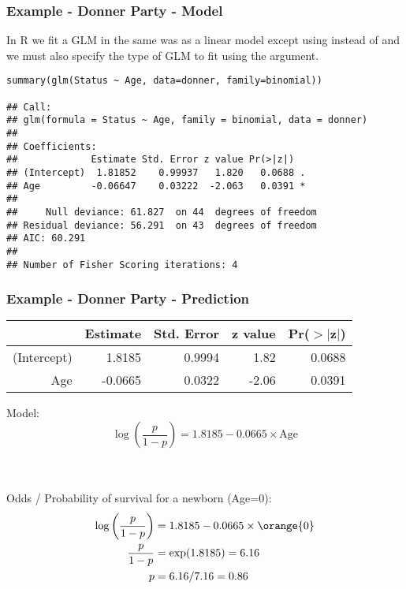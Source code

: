\begin{frame}[fragile]
\frametitle{Example - Donner Party - Model}
\vspace{-2mm}
In R we fit a GLM in the same was as a linear model except using  instead of  and we must also specify the type of GLM to fit using the  argument.\\

\vspace{2mm}

{\scriptsize
\begin{verbatim}
summary(glm(Status ~ Age, data=donner, family=binomial))

## Call:
## glm(formula = Status ~ Age, family = binomial, data = donner) 
## 
## Coefficients:
##             Estimate Std. Error z value Pr(>|z|)  
## (Intercept)  1.81852    0.99937   1.820   0.0688 .
## Age         -0.06647    0.03222  -2.063   0.0391 *
## 
##     Null deviance: 61.827  on 44  degrees of freedom
## Residual deviance: 56.291  on 43  degrees of freedom
## AIC: 60.291
## 
## Number of Fisher Scoring iterations: 4
\end{verbatim}
}
\end{frame}



\begin{frame}
\frametitle{Example - Donner Party - Prediction}

{\scriptsize
\begin{center}
\begin{tabular}{rrrrr}
  \hline
 & Estimate & Std. Error & z value & Pr($>$$|$z$|$) \\ 
  \hline
(Intercept) & 1.8185 & 0.9994 & 1.82 & 0.0688 \\ 
  Age & -0.0665 & 0.0322 & -2.06 & 0.0391 \\ 
   \hline
\end{tabular}
\end{center}
}

Model:
\[\log\left(\frac{p}{1-p}\right) = 1.8185-0.0665\times \text{Age}\]

\pause
~\\~\\
Odds / Probability of survival for a newborn (Age=0):
\pause
{\scriptsize
\begin{align*}
\log\left(\frac{p}{1-p}\right) &= 1.8185-0.0665\times \orange{0}\\
\frac{p}{1-p} &= \exp(1.8185) = 6.16 \\
p &= 6.16/7.16 = 0.86 
\end{align*}
}

\end{frame}

